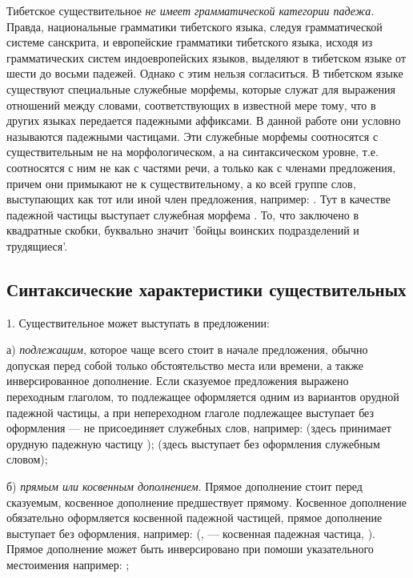 \label{page71}Тибетское существительное \emph{не имеет грамматической категории падежа}. Правда, национальные грамматики тибетского языка, следуя грамматической системе санскрита, и европейские грамматики тибетского языка, исходя из грамматических систем индоевропейских языков, выделяют в тибетском языке от шести до восьми падежей. Однако с этим нельзя согласиться. В тибетском языке существуют специальные служебные морфемы, которые служат для выражения отношений между словами, соответствующих в известной мере тому, что в других языках передается падежными аффиксами. В данной работе они условно называются падежными частицами. Эти служебные морфемы соотносятся с существительным не на морфологическом, а на синтаксическом уровне, т.е. соотносятся с ним не как с частями речи, а только как с членами предложения, причем они примыкают не к существительному, а ко всей группе слов, выступающих как тот или иной член предложения, например:
. Тут в качестве падежной частицы выступает
служебная морфема . То, что заключено в квадратные скобки, буквально значит 'бойцы воинских подразделений и трудящиеся'.

\subsection{Синтаксические характеристики существительных}

1. Существительное может выступать в предложении:

а) \emph{подлежащим}, которое чаще всего стоит в начале предложения, обычно допуская перед собой только обстоятельство места или времени, а также инверсированное дополнение. Если сказуемое предложения выражено переходным глаголом, то подлежащее оформляется одним из вариантов орудной падежной частицы, а при непереходном глаголе подлежащее выступает без оформления --- не присоединяет служебных слов, например:
 (здесь   принимает орудную падежную частицу );
 (здесь  выступает без оформления служебным словом);

б) \emph{прямым или косвенным дополнением}. Прямое дополнение стоит перед сказуемым, косвенное дополнение предшествует прямому. Косвенное дополнение обязательно оформляется косвенной падежной частицей, прямое дополнение выступает без оформления, например:
 (,  --- косвенная падежная частица, ). Прямое дополнение может быть инверсировано при помоши указательного местоимения  например:
;

